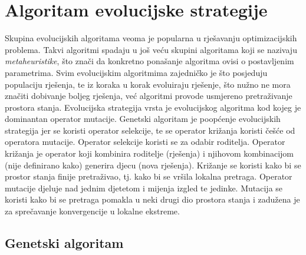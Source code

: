 \documentclass[times, utf8, diplomski, numeric]{fer}
\begin{document}
\section{Algoritam evolucijske strategije}

Skupina evolucijskih algoritama veoma je popularna u rješavanju optimizacijskih problema. Takvi algoritmi spadaju u još veću skupini algoritama koji se nazivaju \emph{metaheuristike}, što znači da konkretno ponašanje algoritma ovisi o postavljenim parametrima. Svim evolucijskim algoritmima zajedničko je što posjeduju populaciju rješenja, te iz koraka u korak evoluiraju rješenje, što nužno ne mora značiti dobivanje boljeg rješenja, već algoritmi provode usmjereno pretraživanje prostora stanja. Evolucijska strategija vrsta je evolucijskog algoritma kod kojeg je dominantan operator mutacije. Genetski algoritam je poopćenje evolucijskih strategija jer se koristi operator selekcije, te se operator križanja koristi češće od operatora mutacije. Operator selekcije koristi se za odabir roditelja. Operator križanja je operator koji kombinira roditelje (rješenja) i njihovom kombinacijom (nije definirano kako) generira djecu (nova rješenja). Križanje se koristi kako bi se prostor stanja finije pretraživao, tj. kako bi se vršila lokalna pretraga. Operator mutacije djeluje nad jednim djetetom i mijenja izgled te jedinke. Mutacija se koristi kako bi se pretraga pomakla u neki drugi dio prostora stanja i zadužena je za sprečavanje konvergencije u lokalne ekstreme. 

\subsection{Genetski algoritam}
\end{document}
